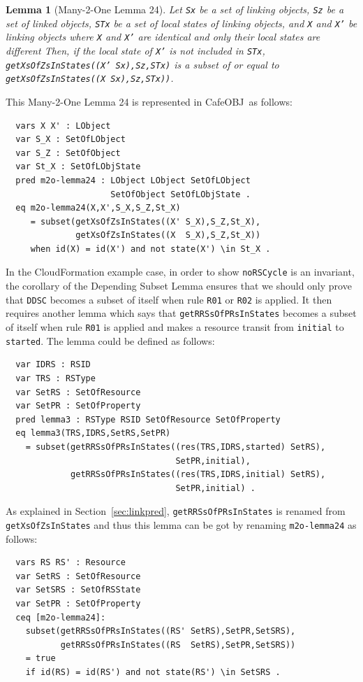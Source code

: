\documentclass[12pt]{report}
\newtheorem{lemma}{Lemma}
\newcommand{\stt}[1]{{\small{\tt {#1}}}}
\newcommand{\cafeobj}{{\sf CafeOBJ}~}
\begin{document}
\begin{lemma}[Many-2-One Lemma 24]
  Let {\tt Sx} be a set of linking objects, {\tt Sz} be a set of
  linked objects, {\tt STx} be a set of local states of linking
  objects, and {\tt X} and {\tt X'} be linking objects where {\tt X}
  and {\tt X'} are identical and only their local states are different
  Then, if the local state of {\tt X'} is not included in {\tt STx},
  \stt{getXsOfZsInStates((X' Sx),Sz,STx)} is a subset of or equal to
  \stt{getXsOfZsInStates((X Sx),Sz,STx))}.
\end{lemma}
This Many-2-One Lemma 24 is represented in \cafeobj as follows:
\begin{verbatim}
  vars X X' : LObject
  var S_X : SetOfLObject
  var S_Z : SetOfObject
  var St_X : SetOfLObjState
  pred m2o-lemma24 : LObject LObject SetOfLObject
                     SetOfObject SetOfLObjState .
  eq m2o-lemma24(X,X',S_X,S_Z,St_X)
     = subset(getXsOfZsInStates((X' S_X),S_Z,St_X),
              getXsOfZsInStates((X  S_X),S_Z,St_X))
     when id(X) = id(X') and not state(X') \in St_X .
\end{verbatim}
In the CloudFormation example case, in order to show {\tt noRSCycle}
is an invariant, the corollary of the Depending Subset Lemma ensures
that we should only prove that {\tt DDSC} becomes a subset of itself
when rule {\tt R01} or {\tt R02} is applied. It then requires another
lemma which says that {\tt getRRSsOfPRsInStates} becomes a subset of
itself when rule {\tt R01} is applied and makes a resource transit
from {\tt initial} to {\tt started}.  The lemma could be defined as
follows:
\begin{verbatim}
  var IDRS : RSID 
  var TRS : RSType
  var SetRS : SetOfResource
  var SetPR : SetOfProperty
  pred lemma3 : RSType RSID SetOfResource SetOfProperty
  eq lemma3(TRS,IDRS,SetRS,SetPR)
    = subset(getRRSsOfPRsInStates((res(TRS,IDRS,started) SetRS),
                                  SetPR,initial), 
             getRRSsOfPRsInStates((res(TRS,IDRS,initial) SetRS),
                                  SetPR,initial) .
\end{verbatim}
As explained in Section~\ref{sec:linkpred}, {\tt getRRSsOfPRsInStates}
is renamed from {\tt getXsOfZsInStates} and thus this lemma can be got
by renaming {\tt m2o-lemma24} as follows:
\begin{verbatim}
  vars RS RS' : Resource
  var SetRS : SetOfResource
  var SetSRS : SetOfRSState
  var SetPR : SetOfProperty
  ceq [m2o-lemma24]:
    subset(getRRSsOfPRsInStates((RS' SetRS),SetPR,SetSRS),
           getRRSsOfPRsInStates((RS  SetRS),SetPR,SetSRS))
    = true
    if id(RS) = id(RS') and not state(RS') \in SetSRS .
\end{verbatim}
\end{document}
